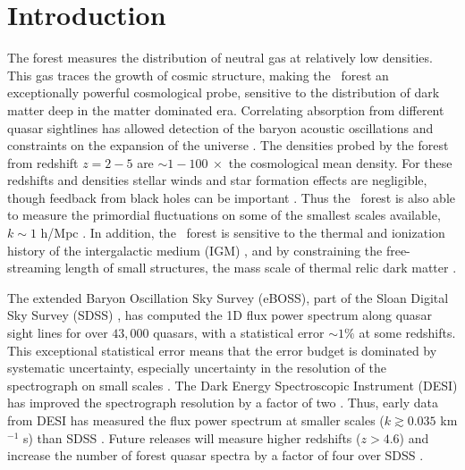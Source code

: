 \section{Introduction}\label{sec:intro}

The \lya forest \citep{1965ApJ...142.1633G, 1998ApJ...495...44C, 1998MNRAS.301..478T, 2000ApJ...543....1M, 2001ApJ...552...15H, 2002MNRAS.329..848V, 2006AJ....132..117F, 2006MNRAS.365..231V, 2006ApJS..163...80M} measures the distribution of neutral gas at relatively low densities.
This gas traces the growth of cosmic structure, making the \lya~forest an exceptionally powerful cosmological probe, sensitive to the distribution of dark matter deep in the matter dominated era.
Correlating absorption from different quasar sightlines has allowed detection of the baryon acoustic oscillations and constraints on the expansion of the universe \cite{2011JCAP...09..001S, 2013JCAP...04..026S, 2020ApJ...901..153D, 2022arXiv220913942C}.
The densities probed by the \lya forest from redshift $z=2-5$ are $\sim 1-100 \ \times$ the cosmological mean density.
For these redshifts and densities stellar winds and star formation effects are negligible, though feedback from black holes can be important \citep{2013MNRAS.429.1734V, 2020MNRAS.495.1825C}.
Thus the \lya~forest is also able to measure the primordial fluctuations on some of the smallest scales available, $k \sim 1$ h/Mpc \citep{2004MNRAS.354..684V, 2005ApJ...635..761M, 2006MNRAS.370L..51V, 2005PhRvD..71j3515S, 2006JCAP...10..014S, 2017JCAP...06..047Y, 2020JCAP...04..038P, 2021JCAP...03..049G}.
In addition, the \lya~forest is sensitive to the thermal and ionization history of the intergalactic medium (IGM) \citep{2008MNRAS.386.1131B,2014MNRAS.438.2499B, 2016MNRAS.463.2335N,2019ApJ...872...13W, 2019ApJ...872..101B, 2019MNRAS.490.3177W,2021MNRAS.506.4389G, 2022ApJ...933...59V}, and by constraining the free-streaming length of small structures, the mass scale of thermal relic dark matter \citep{2005PhRvD..71f3534V,  2013PhRvD..88d3502V, 2017PhRvD..96b3522I, 2020JCAP...04..038P, 2021MNRAS.502.2356G, 2021PhRvL.126g1302R, 2022arXiv220914220V}.

The extended Baryon Oscillation Sky Survey (eBOSS), part of the Sloan Digital Sky Survey (SDSS) \cite{2019JCAP...07..017C}, has computed the 1D flux power spectrum along quasar sight lines for over $43,000$ quasars, with a statistical error $\sim 1\%$ at some redshifts.
This exceptional statistical error means that the error budget is dominated by systematic uncertainty, especially uncertainty in the resolution of the spectrograph on small scales \cite{2019JCAP...07..017C}.
The Dark Energy Spectroscopic Instrument (DESI) has improved the spectrograph resolution by a factor of two \cite{2022AJ....164..207A}.
Thus, early data from DESI has measured the flux power spectrum at smaller scales ($k \gtrsim 0.035$ km$^{-1}$ s) than SDSS \cite{2023arXiv230606316G, 2023arXiv230606311R}.
Future releases will measure higher redshifts ($z>4.6$) and increase the number of \lya forest quasar spectra by a factor of four over SDSS \cite{2016arXiv161100036D}.

